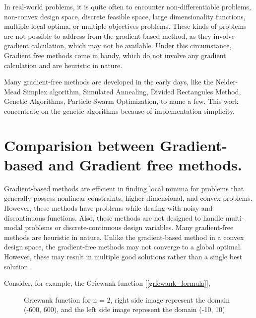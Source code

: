 In real-world problems, it is quite often to encounter non-differentiable problems, non-convex design space, discrete feasible space, large dimensionality functions, multiple local optima, or multiple objectives problems. These kinds of problems are not possible to address from the gradient-based method, as they involve gradient calculation, which may not be available. Under this circumstance, Gradient free methods come in handy, which do not involve any gradient calculation and are heuristic in nature. 

Many gradient-free methods are developed in the early days, like the Nelder-Mead Simplex algorithm, Simulated Annealing, Divided Rectangules Method, Genetic Algorithms, Particle Swarm Optimization, to name a few. This work concentrate on the genetic algorithms because of implementation simplicity.

\section{Comparision between Gradient-based and Gradient free methods.}
Gradient-based methods are efficient in finding local minima for problems that generally possess nonlinear constraints, higher dimensional, and convex problems\cite{stanford_university}. However, these methods have problems while dealing with noisy and discontinuous functions. Also, these methods are not designed to handle multi-modal problems or discrete-continuous design variables. Many gradient-free methods are heuristic in nature. Unlike the gradient-based method in a convex design space, the gradient-free methods may not converge to a global optimal. However, these may result in multiple good solutions rather than a single best solution.

Consider, for example, the Griewank function [\ref{griewank_formula}],

\begin{figure}[!htbp]
    \centering
    \caption{Griewank function for n = 2, right side image represent the domain (-600, 600), and the left side image represent the domain (-10, 10) \cite{griewank_reference}}
    \label{griewank}
\end{figure}

